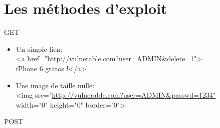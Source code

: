 \section{Les méthodes d'exploit}

\frame{\tableofcontents[currentsection]}

\begin{frame}

\begin{block}{GET}

\begin{itemize}

\item Un simple lien: \\
<a href="\url{http://vulnerable.com?user=ADMIN&delete=1"}>\\
iPhone 6 gratos !</a>

\item Une image de taille nulle: \\
<img src="\url{http://vulnerable.com?user=ADMIN&passwd=1234"}\\
 width="0" height="0" border="0">

\end{itemize}

\end{block}

\end{frame}


\begin{frame}
\begin{block}{POST}
	
\end{block}
\end{frame}

